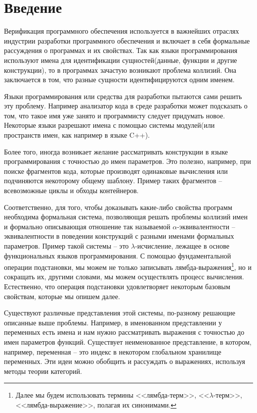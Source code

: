 \section*{Введение}

Верификация программного обеспечения используется в важнейших отраслях индустрии разработки программного обеспечения и включает в себя формальные рассуждения о программах и их свойствах. Так как языки программирования используют имена для идентификации сущностей(данные, функции и другие конструкции), то в программах зачастую возникают проблема коллизий. Она заключается в том, что разные сущности идентифицируются одним именем.

Языки программирования или средства для разработки пытаются сами решить эту проблему. Например анализатор кода в среде разработки может подсказать о том, что такое имя уже занято и программисту следует придумать новое. Некоторые языки разрешают имена с помощью системы модулей(или пространств имен, как например в языке C++).

Более того, иногда возникает желание рассматривать конструкции в языке программирования с точностью до имен параметров. Это полезно, например, при поиске фрагментов кода, которые производят одинаковые вычисления или подчиняются некоторому общему шаблону. Пример таких фрагментов -- всевозможные циклы и обходы контейнеров.

Соответственно, для того, чтобы доказывать какие-либо свойства программ необходима формальная система, позволяющая решать проблемы коллизий имен и формально описывающая отношение так называемой $\alpha$-эквивалентности -- эквивалентности в поведении конструкций с разными именами формальных параметров. Пример такой системы -- это $\lambda$-исчисление, лежащее в основе функциональных языков программирования. С помощью фундаментальной операции подстановки, мы можем не только записывать лямбда-выражения\footnote{Далее мы будем использовать термины <<лямбда-терм>>, <<$\lambda$-терм>>, <<лямбда-выражение>>, полагая их синонимами.}, но и сокращать их, другими словами, мы можем осуществлять процесс вычисления. Естественно, что операция подстановки удовлетворяет некоторым базовым свойствам, которые мы опишем далее.

Существуют различные представления этой системы, по-разному решающие описанные выше проблемы. Например, в именованном представлении у переменных есть имена и нам нужно рассматривать выражения с точностью до имен параметров функций. Существует неименованное представление, в котором, например, переменная -- это индекс в некотором глобальном хранилище переменных. Эти идеи можно обобщить и рассуждать о выражениях, используя методы теории категорий.

